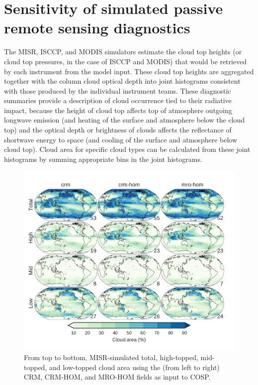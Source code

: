 \section{Sensitivity of simulated passive remote sensing
diagnostics}\label{sensitivity-of-simulated-passive-remote-sensing-diagnostics}

The MISR, ISCCP, and MODIS simulators estimate the cloud top heights (or
cloud top pressures, in the case of ISCCP and MODIS) that would be
retrieved by each instrument from the model input. These cloud top
heights are aggregated together with the column cloud optical depth into
joint histograms consistent with those produced by the individual
instrument teams. These diagnostic summaries provide a description of
cloud occurrence tied to their radiative impact, because the height of
cloud top affects top of atmosphere outgoing longwave emission (and
heating of the surface and atmosphere below the cloud top) and the
optical depth or brightness of clouds affects the reflectance of
shortwave energy to space (and cooling of the surface and atmosphere
below cloud top). Cloud area for specific cloud types can be calculated
from these joint histograms by summing appropriate bins in the joint
histograms.

\begin{figure}[htbp]
\centering
\includegraphics{graphics/subgrid1_cldmisr_maps.pdf}
\caption{\label{fig:cldmisrMapsMro}From top to bottom, MISR-simulated
total, high-topped, mid-topped, and low-topped cloud area using the
(from left to right) CRM, CRM-HOM, and MRO-HOM fields as input to
COSP.}\label{fig:cldmisrMapsMro}
\end{figure}

